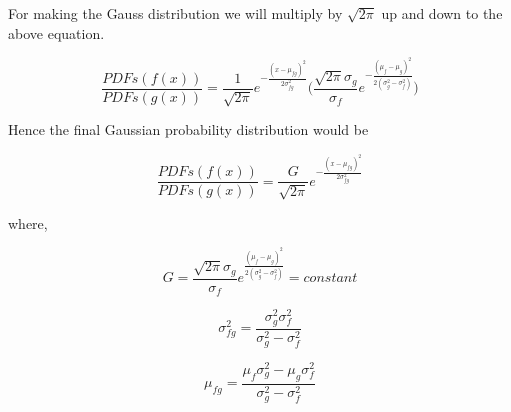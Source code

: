 For making the Gauss distribution we will multiply by $\sqrt{2\pi}$ up and down to the above equation.

$$\frac{PDFs(f(x))}{PDFs(g(x))}= \frac{1}{\sqrt{2\pi}} e^{-\frac{(x-\mu_{fg})^2}{2\sigma_{fg}^2}} \Bigg( \frac{\sqrt{2\pi} \sigma_g}{\sigma_f}  e^{-\frac{(\mu_f-\mu_g)^2}{2(\sigma_g^2 -\sigma_f^2 )}}   \Bigg) $$

Hence the final Gaussian probability distribution would be 

\begin{equation}
    \boxed{\frac{PDFs(f(x))}{PDFs(g(x))} = \frac{G}{\sqrt{2\pi}} e^{-\frac{(x-\mu_{fg})^2}{2\sigma_{fg}^2}}}
\end{equation}

where, 

$$G = \frac{\sqrt{2\pi} \sigma_g}{\sigma_f}  e^{\frac{(\mu_f-\mu_g)^2}{2(\sigma_g^2 -\sigma_f^2 )}} = constant $$

$$\sigma_{fg}^2 = \frac{\sigma_g^2 \sigma_f^2}{\sigma_g^2 - \sigma_f^2}$$


$$\mu_{fg} = \frac{\mu_f\sigma_g^2 - \mu_g \sigma_f^2 }{\sigma_g^2 - \sigma_f^2}$$
